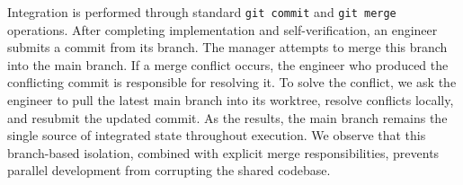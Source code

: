 
Integration is performed through standard \texttt{git commit} and \texttt{git merge} operations. After completing implementation and self-verification, an engineer submits a commit from its branch. The manager attempts to merge this branch into the main branch. If a merge conflict occurs, the engineer who produced the conflicting commit is responsible for resolving it. To solve the conflict, we ask the engineer to pull the latest main branch into its worktree, resolve conflicts locally, and resubmit the updated commit. As the results, the main branch remains the single source of integrated state throughout execution. We observe that this branch-based isolation, combined with explicit merge responsibilities, prevents parallel development from corrupting the shared codebase.

